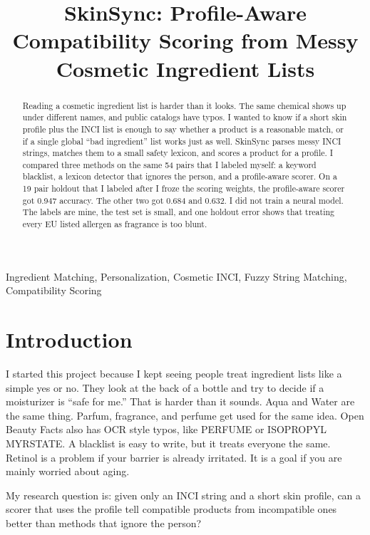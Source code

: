 \documentclass[conference]{IEEEtran}
\begin{document}
\title{SkinSync: Profile-Aware Compatibility Scoring from Messy Cosmetic Ingredient Lists}

\author{
}

\maketitle

\begin{abstract}
Reading a cosmetic ingredient list is harder than it looks. The same chemical shows up under different names, and public catalogs have typos. I wanted to know if a short skin profile plus the INCI list is enough to say whether a product is a reasonable match, or if a single global ``bad ingredient'' list works just as well. SkinSync parses messy INCI strings, matches them to a small safety lexicon, and scores a product for a profile. I compared three methods on the same 54 pairs that I labeled myself: a keyword blacklist, a lexicon detector that ignores the person, and a profile-aware scorer. On a 19 pair holdout that I labeled after I froze the scoring weights, the profile-aware scorer got 0.947 accuracy. The other two got 0.684 and 0.632. I did not train a neural model. The labels are mine, the test set is small, and one holdout error shows that treating every EU listed allergen as fragrance is too blunt.
\end{abstract}

\begin{IEEEkeywords}
Ingredient Matching, Personalization, Cosmetic INCI, Fuzzy String Matching, Compatibility Scoring
\end{IEEEkeywords}

\section{Introduction}
I started this project because I kept seeing people treat ingredient lists like a simple yes or no. They look at the back of a bottle and try to decide if a moisturizer is ``safe for me.'' That is harder than it sounds. Aqua and Water are the same thing. Parfum, fragrance, and perfume get used for the same idea. Open Beauty Facts also has OCR style typos, like PERFUME or ISOPROPYL MYRSTATE. A blacklist is easy to write, but it treats everyone the same. Retinol is a problem if your barrier is already irritated. It is a goal if you are mainly worried about aging.

My research question is: given only an INCI string and a short skin profile, can a scorer that uses the profile tell compatible products from incompatible ones better than methods that ignore the person?
\end{document}
